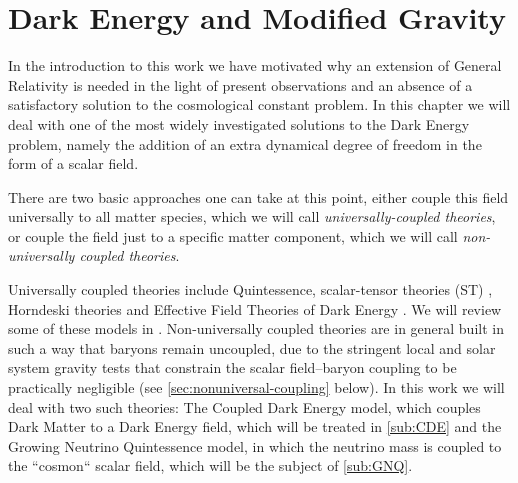 %



\section{Dark Energy and Modified Gravity}

In the introduction to this work we have motivated why an extension of General Relativity
is needed in the light of present observations and an absence of a satisfactory
solution to the cosmological constant problem.
In this chapter we will deal with one of the most widely investigated solutions to the Dark Energy problem,
namely the addition of an extra dynamical degree of freedom in the form of a scalar field.

There are two basic approaches one can take at this point, either couple this field universally to all matter species, which we will call \emph{ universally-coupled theories},
or couple the field just to a specific matter component, which we will call
\emph{non-universally coupled theories}.

Universally coupled theories include Quintessence, scalar-tensor theories (ST) \cite{Luca, Skordis, de Felice, etc.}, Horndeski theories \cite{cite Horndeski, Defayyet} and Effective Field Theories of Dark Energy \cite{cite, EFT, people}.
We will review some of these models in .
Non-universally coupled theories are in general built in such a way that baryons remain uncoupled, due to the stringent local and solar system gravity tests that constrain the scalar field--baryon coupling to be practically negligible (see \cref{sec:nonuniversal-coupling} below). In this work we will 
deal with two such theories: The Coupled Dark Energy model, which couples Dark Matter to a Dark Energy field, which will be treated in \cref{sub:CDE} and the Growing Neutrino Quintessence model, in which the neutrino mass is coupled to the ``cosmon`` scalar field, which will be the subject of \cref{sub:GNQ}.


